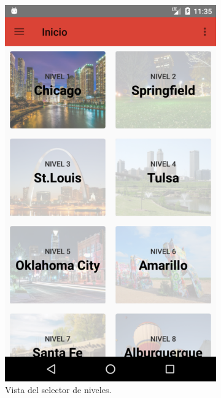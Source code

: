 \documentclass[twoside]{report}
\begin{document}
\begin{figure}[H]
\begin{center}
	\begin{subfigure}[t]{.3\linewidth}
		\includegraphics[scale=0.2]{images/userguide/1.png}
		\caption{Vista del selector de niveles.}
	\end{subfigure}\hspace{3mm}%
	\begin{subfigure}[t]{.3\linewidth}

\end{subfigure}
\end{center}
\end{figure}
\end{document}
